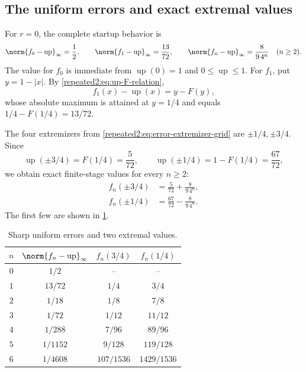\documentclass[11pt,oneside]{article}
\theoremstyle{definition}
\theoremstyle{remark}
\newcommand{\Up}{\operatorname{up}}
\begin{document}
\subsection{The uniform errors and exact extremal values}

For $r=0$, the complete startup behavior is
\begin{equation}
 \norm{f_0-\Up}_\infty=\frac12,
 \qquad
 \norm{f_1-\Up}_\infty=\frac{13}{72},
 \qquad
 \norm{f_n-\Up}_\infty=\frac{8}{9\,4^n}\quad(n\ge2).
 \label{repeated2:eq:all-uniform-errors}
\end{equation}
The value for $f_0$ is immediate from $\Up(0)=1$ and $0\le\Up\le1$.  For $f_1$, put
$y=1-|x|$.  By \eqref{repeated2:eq:up-F-relation},
\begin{equation}
 f_1(x)-\Up(x)=y-F(y),
 \label{repeated2:eq:f1-error-F}
\end{equation}
whose absolute maximum is attained at $y=1/4$ and equals
$1/4-F(1/4)=13/72$.

The four extremizers from \eqref{repeated2:eq:error-extremizer-grid} are
$\pm1/4,\pm3/4$.  Since
\begin{equation}
 \Up(\pm3/4)=F(1/4)=\frac5{72},
 \qquad
 \Up(\pm1/4)=1-F(1/4)=\frac{67}{72},
 \label{repeated2:eq:up-quarter-values}
\end{equation}
we obtain exact finite-stage values for every $n\ge2$:
\begin{align}
 f_n(\pm3/4)&=\frac5{72}+\frac{8}{9\,4^n},
 \label{repeated2:eq:fn-threequarter}\\
 f_n(\pm1/4)&=\frac{67}{72}-\frac{8}{9\,4^n}.
 \label{repeated2:eq:fn-onequarter}
\end{align}
The first few are shown in \cref{repeated2:tab:exact-errors}.

\begin{table}[htbp]
\centering
\caption{Sharp uniform errors and two extremal values.}
\label{repeated2:tab:exact-errors}
\begin{tabular}{c@{\qquad}c@{\qquad}c@{\qquad}c}
\toprule
$n$&$\norm{f_n-\Up}_\infty$&$f_n(3/4)$&$f_n(1/4)$\\
\midrule
$0$&$1/2$&--&--\\
$1$&$13/72$&$1/4$&$3/4$\\
$2$&$1/18$&$1/8$&$7/8$\\
$3$&$1/72$&$1/12$&$11/12$\\
$4$&$1/288$&$7/96$&$89/96$\\
$5$&$1/1152$&$9/128$&$119/128$\\
$6$&$1/4608$&$107/1536$&$1429/1536$\\
\bottomrule
\end{tabular}
\end{table}
\end{document}
